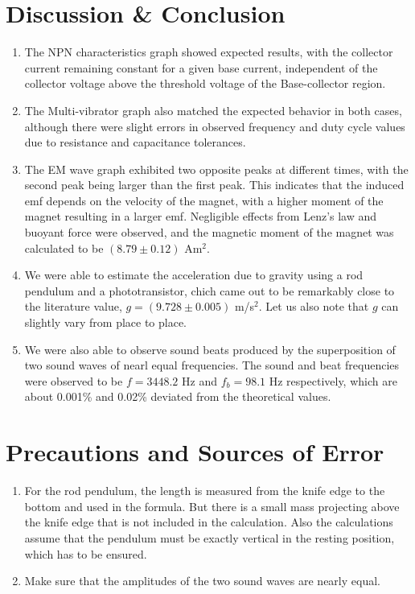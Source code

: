 \section{Discussion \& Conclusion}
	\begin{enumerate}
		\item The NPN characteristics graph showed expected results, with the collector current remaining constant for a given base current, independent of the collector voltage above the threshold voltage of the Base-collector region.
		\item The Multi-vibrator graph also matched the expected behavior in both cases, although there were slight errors in observed frequency and duty cycle values due to resistance and capacitance tolerances.
		\item The EM wave graph exhibited two opposite peaks at different times, with the second peak being larger than the first peak. This indicates that the induced emf depends on the velocity of the magnet, with a higher moment of the magnet resulting in a larger emf. Negligible effects from Lenz's law and buoyant force were observed, and the magnetic moment of the magnet was calculated to be $(8.79\pm 0.12)$ Am$^2$.
		\item We were able to estimate the acceleration due to gravity using a rod pendulum and a phototransistor, chich came out to be remarkably close to the literature value, $g=(9.728\pm 0.005)$ m/s$^2$. Let us also note that $g$ can slightly vary from place to place.
		\item We were also able to observe sound beats produced by the superposition of two sound waves of nearl equal frequencies. The sound and beat frequencies were observed to be $f=3448.2$ Hz and $f_b=98.1$ Hz respectively, which are about 0.001\% and 0.02\% deviated from the theoretical values.
	\end{enumerate}

\section{Precautions and Sources of Error}

    \begin{enumerate}
        \item For the rod pendulum, the length is measured from the knife edge to the bottom and used in the
		formula. But there is a small mass projecting above the knife edge that is not included in the calculation.
		Also the calculations assume that the pendulum must be exactly vertical in the resting position, which
		has to be ensured.
		\item Make sure that the amplitudes of the two sound waves are nearly equal.
    \end{enumerate}

